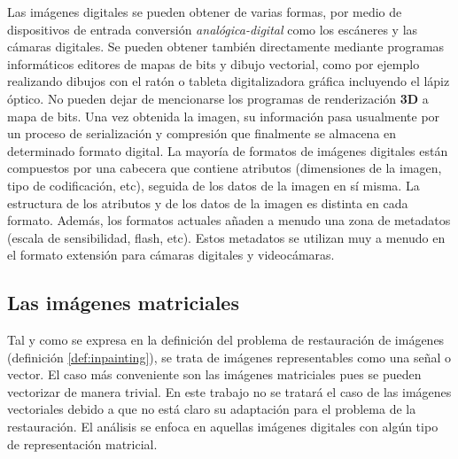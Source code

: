 Las imágenes digitales se pueden obtener de varias formas, por medio de dispositivos de entrada conversión \textit{analógica-digital} como los escáneres y las cámaras digitales. Se pueden obtener tambi\'en directamente mediante programas informáticos editores de mapas de bits y dibujo vectorial, como por ejemplo realizando dibujos con el ratón o tableta digitalizadora gráfica incluyendo el lápiz óptico. No pueden dejar de mencionarse los programas de renderización \textbf{3D} a mapa de bits. Una vez obtenida la imagen, su informaci\'on pasa usualmente por un proceso de serializaci\'on y compresi\'on que finalmente se almacena en determinado formato digital. La mayoría de formatos de imágenes digitales están compuestos por una cabecera que contiene atributos (dimensiones de la imagen, tipo de codificación, etc), seguida de los datos de la imagen en sí misma. La estructura de los atributos y de los datos de la imagen es distinta en cada formato. Además, los formatos actuales añaden a menudo una zona de metadatos (escala de sensibilidad, flash, etc). Estos metadatos se utilizan muy a menudo en el formato extensión para cámaras digitales y videocámaras.

\subsection{Las im\'agenes matriciales}

Tal y como se expresa en la definici\'on del problema de restauraci\'on de im\'agenes (definici\'on \ref{def:inpainting}), se trata de im\'agenes representables como una señal o vector. El caso m\'as conveniente son las im\'agenes matriciales pues se pueden vectorizar de manera trivial. En este trabajo no se tratar\'a el caso de las im\'agenes vectoriales debido a que no est\'a claro su adaptaci\'on para el problema de la restauraci\'on. El análisis se enfoca en aquellas im\'agenes digitales con alg\'un tipo de representaci\'on matricial.

